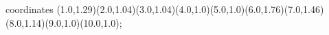 					coordinates { (1.0,1.29)(2.0,1.04)(3.0,1.04)(4.0,1.0)(5.0,1.0)(6.0,1.76)(7.0,1.46)(8.0,1.14)(9.0,1.0)(10.0,1.0)};